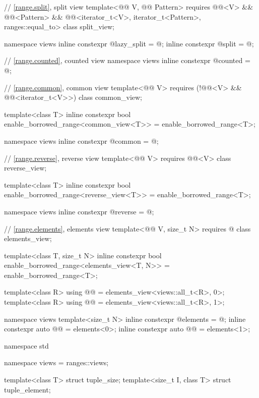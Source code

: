\begin{codeblock}
{  // \ref{range.split}, split view
 template<@@ V, @@ Pattern>
   requires @@<V> && @@<Pattern> &&
            @@<iterator_t<V>, iterator_t<Pattern>, ranges::equal_to>
  class split_view;

  namespace views {
    inline constexpr @\unspec@ lazy_split = @\unspec@;
    inline constexpr @\unspec@ split = @\unspec@;
  }

  // \ref{range.counted}, counted view
  namespace views { inline constexpr @\unspec@ counted = @\unspec@; }

  // \ref{range.common}, common view
  template<@@ V>
    requires (!@@<V> && @@<iterator_t<V>>)
  class common_view;

  template<class T>
    inline constexpr bool enable_borrowed_range<common_view<T>> = enable_borrowed_range<T>;

  namespace views { inline constexpr @\unspec@ common = @\unspec@; }

  // \ref{range.reverse}, reverse view
  template<@@ V>
    requires @@<V>
  class reverse_view;

  template<class T>
    inline constexpr bool enable_borrowed_range<reverse_view<T>> = enable_borrowed_range<T>;

  namespace views { inline constexpr @\unspec@ reverse = @\unspec@; }

  // \ref{range.elements}, elements view
  template<@@ V, size_t N>
    requires @\seebelow@
  class elements_view;

  template<class T, size_t N>
    inline constexpr bool enable_borrowed_range<elements_view<T, N>> = enable_borrowed_range<T>;

  template<class R>
    using @@ = elements_view<views::all_t<R>, 0>;
  template<class R>
    using @@ = elements_view<views::all_t<R>, 1>;

  namespace views {
    template<size_t N>
      inline constexpr @\unspec@ elements = @\unspec@;
    inline constexpr auto @@ = elements<0>;
    inline constexpr auto @@ = elements<1>;
  }
}

namespace std {
  namespace views = ranges::views;

  template<class T> struct tuple_size;
  template<size_t I, class T> struct tuple_element;

}
\end{codeblock}
